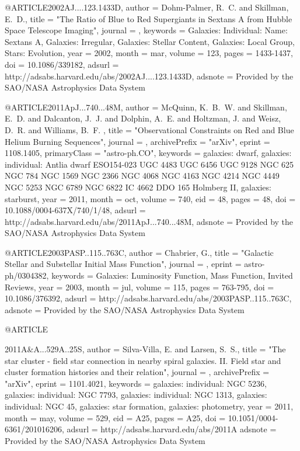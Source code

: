 {{@ARTICLE{2002AJ....123.1433D,
   author = {{Dohm-Palmer}, R.~C. and {Skillman}, E.~D.},
    title = "{The Ratio of Blue to Red Supergiants in Sextans A from Hubble Space Telescope Imaging}",
  journal = {\aj},
 keywords = {Galaxies: Individual: Name: Sextans A, Galaxies: Irregular, Galaxies: Stellar Content, Galaxies: Local Group, Stars: Evolution},
     year = 2002,
    month = mar,
   volume = 123,
    pages = {1433-1437},
      doi = {10.1086/339182},
   adsurl = {http://adsabs.harvard.edu/abs/2002AJ....123.1433D},
  adsnote = {Provided by the SAO/NASA Astrophysics Data System}
}

@ARTICLE{2011ApJ...740...48M,
   author = {{McQuinn}, K.~B.~W. and {Skillman}, E.~D. and {Dalcanton}, J.~J. and 
	{Dolphin}, A.~E. and {Holtzman}, J. and {Weisz}, D.~R. and {Williams}, B.~F.
	},
    title = "{Observational Constraints on Red and Blue Helium Burning Sequences}",
  journal = {\apj},
archivePrefix = "arXiv",
   eprint = {1108.1405},
 primaryClass = "astro-ph.CO",
 keywords = {galaxies: dwarf, galaxies: individual: Antlia dwarf ESO154-023 UGC 4483 UGC 6456 UGC 9128 NGC 625 NGC 784 NGC 1569 NGC 2366 NGC 4068 NGC 4163 NGC 4214 NGC 4449 NGC 5253 NGC 6789 NGC 6822 IC 4662 DDO 165 Holmberg II, galaxies: starburst},
     year = 2011,
    month = oct,
   volume = 740,
      eid = {48},
    pages = {48},
      doi = {10.1088/0004-637X/740/1/48},
   adsurl = {http://adsabs.harvard.edu/abs/2011ApJ...740...48M},
  adsnote = {Provided by the SAO/NASA Astrophysics Data System}
}


@ARTICLE{2003PASP..115..763C,
   author = {{Chabrier}, G.},
    title = "{Galactic Stellar and Substellar Initial Mass Function}",
  journal = {\pasp},
   eprint = {astro-ph/0304382},
 keywords = {Galaxies: Luminosity Function, Mass Function, Invited Reviews},
     year = 2003,
    month = jul,
   volume = 115,
    pages = {763-795},
      doi = {10.1086/376392},
   adsurl = {http://adsabs.harvard.edu/abs/2003PASP..115..763C},
  adsnote = {Provided by the SAO/NASA Astrophysics Data System}
}


@ARTICLE{2011A&A...529A..25S,
   author = {{Silva-Villa}, E. and {Larsen}, S.~S.},
    title = "{The star cluster - field star connection in nearby spiral galaxies. II. Field star and cluster formation histories and their relation}",
  journal = {\aap},
archivePrefix = "arXiv",
   eprint = {1101.4021},
 keywords = {galaxies: individual: NGC 5236, galaxies: individual: NGC 7793, galaxies: individual: NGC 1313, galaxies: individual: NGC 45, galaxies: star formation, galaxies: photometry},
     year = 2011,
    month = may,
   volume = 529,
      eid = {A25},
    pages = {A25},
      doi = {10.1051/0004-6361/201016206},
   adsurl = {http://adsabs.harvard.edu/abs/2011A%
  adsnote = {Provided by the SAO/NASA Astrophysics Data System}
}

}}}
